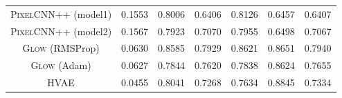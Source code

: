 {\begin{table}[tb]
{\begin{tabular}{ccccccc}
            \textsc{PixelCNN++} (model1)  & 0.1553 & 0.8006 & 0.6406 & 0.8126 & 0.6457 & 0.6407 \\
            \textsc{PixelCNN++} (model2) & 0.1567 & 0.7923 & 0.7070 & 0.7955 & 0.6498 &  0.7067\\
            \textsc{Glow} (RMSProp)  & 0.0630 & 0.8585 & 0.7929 & 0.8621 & 0.8651 &  0.7940\\
            \textsc{Glow} (Adam)   & 0.0627 & 0.7844 & 0.7620 &  0.7838 &  0.8624 &  0.7655 \\
            \textsc{HVAE}  & 0.0455 & 0.8041 &  0.7268 & 0.7634 & 0.8845 & 0.7334\\
            \bottomrule
        \end{tabular}
        \label{tab_modelagnostic:mmd}
    }
\end{table}


}
